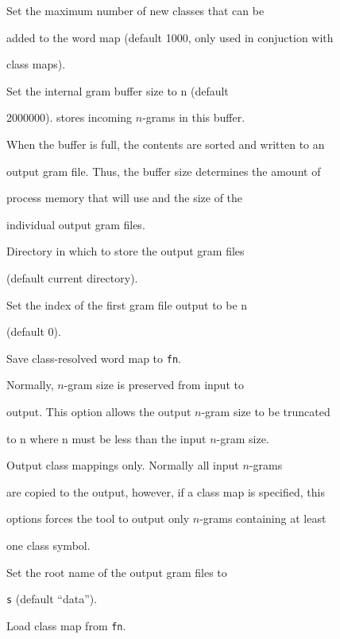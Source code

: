\begin{optlist}





   Set the maximum number of new classes that can be


   added to the word map (default 1000, only used in conjuction with


   class maps).





   Set the internal gram buffer size to n (default


   2000000).  stores incoming $n$-grams in this buffer.


   When the buffer is full, the contents are sorted and written to an


   output gram file. Thus, the buffer size determines the amount of


   process memory that  will use and the size of the


   individual output gram files.





   Directory in which to store the output gram files


   (default current directory).





   Set the index of the first gram file output to be n


   (default 0).





   Save class-resolved word map to \texttt{fn}.





   Normally, $n$-gram size is preserved from input to


   output.  This option allows the output $n$-gram size to be truncated


   to n where n must be less than the input $n$-gram size.





   Output class mappings only. Normally all input $n$-grams


   are copied to the output, however, if a class map is specified, this


   options forces the tool to output only $n$-grams containing at least


   one class symbol.





   Set the root name of the output gram files to


   \texttt{s} (default ``data'').





   Load class map from \texttt{fn}.





\end{optlist}


